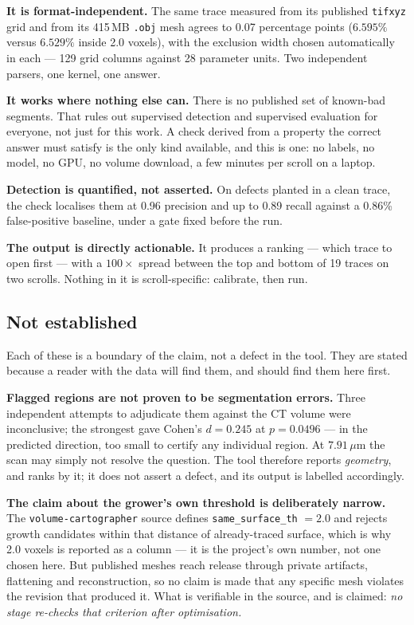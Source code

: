 \documentclass[11pt,a4paper]{article}
\begin{document}
\textbf{It is format-independent.} The same trace measured from its published
\texttt{tifxyz} grid and from its 415\,MB \texttt{.obj} mesh agrees to
0.07 percentage points ($6.595\%$ versus $6.529\%$ inside 2.0 voxels), with the
exclusion width chosen automatically in each --- 129 grid columns against 28
parameter units. Two independent parsers, one kernel, one answer.

\textbf{It works where nothing else can.} There is no published set of known-bad
segments. That rules out supervised detection and supervised evaluation for
everyone, not just for this work. A check derived from a property the correct
answer must satisfy is the only kind available, and this is one: no labels, no
model, no GPU, no volume download, a few minutes per scroll on a laptop.

\textbf{Detection is quantified, not asserted.} On defects planted in a clean
trace, the check localises them at 0.96 precision and up to 0.89 recall against
a 0.86\% false-positive baseline, under a gate fixed before the run.

\textbf{The output is directly actionable.} It produces a ranking --- which
trace to open first --- with a $100\times$ spread between the top and bottom of
19 traces on two scrolls. Nothing in it is scroll-specific: calibrate, then run.

\subsection*{Not established}

Each of these is a boundary of the claim, not a defect in the tool. They are
stated because a reader with the data will find them, and should find them here
first.

\textbf{Flagged regions are not proven to be segmentation errors.} Three
independent attempts to adjudicate them against the CT volume were
inconclusive; the strongest gave Cohen's $d = 0.245$ at $p = 0.0496$ --- in the
predicted direction, too small to certify any individual region. At $7.91\,\mu$m
the scan may simply not resolve the question. The tool therefore reports
\emph{geometry}, and ranks by it; it does not assert a defect, and its output is
labelled accordingly.

\begin{sloppypar}
\textbf{The claim about the grower's own threshold is deliberately narrow.} The
\texttt{volume-cartographer} source defines \texttt{same\_surface\_th} $=2.0$ and
rejects growth candidates within that distance of already-traced surface, which
is why 2.0 voxels is reported as a column --- it is the project's own number,
not one chosen here. But published meshes reach release through private
artifacts, flattening and reconstruction, so no claim is made that any specific
mesh violates the revision that produced it. What is verifiable in the source,
and is claimed: \emph{no stage re-checks that criterion after optimisation.}
\end{sloppypar}
\end{document}
